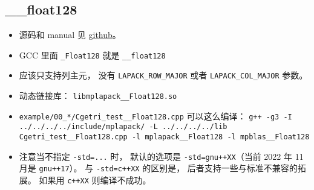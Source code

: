 
\begin{issues}
\issueDraft
\end{issues}


\subsection{\_\_float128}
\begin{itemize}
\item 源码和 manual 见 \href{https://github.com/nakatamaho/mplapack}{github}。
\item GCC 里面 \verb|_Float128| 就是 \verb|__float128|
\item 应该只支持列主元， 没有 \verb|LAPACK_ROW_MAJOR| 或者 \verb|LAPACK_COL_MAJOR| 参数。
\item 动态链接库： \verb|libmplapack__Float128.so|
\item \verb|example/00_*/Cgetri_test__Float128.cpp| 可以这么编译： \verb|g++ -g3 -I ../../../../include/mplapack/ -L ../../../../lib Cgetri_test__Float128.cpp -l mplapack__Float128 -l mpblas__Float128|
\item 注意当不指定 \verb|-std=...| 时， 默认的选项是 \verb|-std=gnu++XX|（当前 2022 年 11 月是 \verb|gnu++17|）。 与 \verb|-std=c++XX| 的区别是， 后者支持一些与标准不兼容的拓展。 如果用 \verb|c++XX| 则编译不成功。
\end{itemize}

